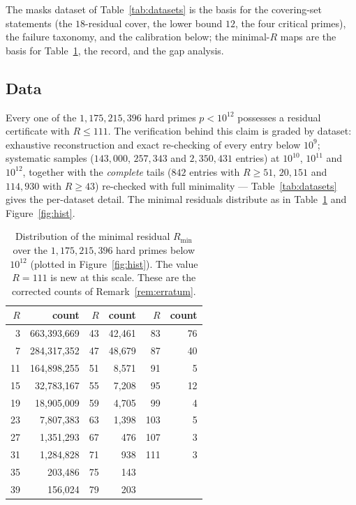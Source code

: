 \documentclass[11pt]{article}
\theoremstyle{plain}
\theoremstyle{remark}
\theoremstyle{plain}
\numberwithin{equation}{section}
\begin{document}
The masks dataset of Table~\ref{tab:datasets} is the basis for the
covering-set statements (the
$18$-residual cover, the lower bound $12$, the four critical primes), the
failure taxonomy, and the calibration below; the
minimal-$R$ maps are the basis for Table~\ref{tab:dist}, the record,
and the gap analysis.

\subsection{Data}

Every one of the $1{,}175{,}215{,}396$ hard primes $p < 10^{12}$ possesses a
residual certificate with $R \le 111$. The verification behind this
claim is graded by dataset: exhaustive reconstruction and exact
re-checking of every entry below $10^9$; systematic samples
($143{,}000$, $257{,}343$ and $2{,}350{,}431$ entries) at $10^{10}$,
$10^{11}$ and $10^{12}$,
together with the \emph{complete} tails ($842$ entries with
$R \ge 51$, $20{,}151$ and $114{,}930$ with $R \ge 43$) re-checked
with full
minimality --- Table~\ref{tab:datasets} gives the per-dataset detail.
The minimal residuals distribute
as in Table~\ref{tab:dist} and Figure~\ref{fig:hist}.

\begin{table}[htbp]
\centering
\begin{tabular}{rr@{\qquad}rr@{\qquad}rr}
\toprule
$R$ & count & $R$ & count & $R$ & count \\ \midrule
3 & 663{,}393{,}669 & 43 & 42{,}461 & 83 & 76 \\
7 & 284{,}317{,}352 & 47 & 48{,}679 & 87 & 40 \\
11 & 164{,}898{,}255 & 51 & 8{,}571 & 91 & 5 \\
15 & 32{,}783{,}167 & 55 & 7{,}208 & 95 & 12 \\
19 & 18{,}905{,}009 & 59 & 4{,}705 & 99 & 4 \\
23 & 7{,}807{,}383 & 63 & 1{,}398 & 103 & 5 \\
27 & 1{,}351{,}293 & 67 & 476 & 107 & 3 \\
31 & 1{,}284{,}828 & 71 & 938 & 111 & 3 \\
35 & 203{,}486 & 75 & 143 &  &  \\
39 & 156{,}024 & 79 & 203 &  &  \\
\bottomrule
\end{tabular}
\caption{Distribution of the minimal residual $R_{\min}$ over the
$1{,}175{,}215{,}396$ hard primes below $10^{12}$ (plotted in
Figure~\ref{fig:hist}). The value $R = 111$ is new at this scale.
These are the corrected counts of Remark~\ref{rem:erratum}.}
\label{tab:dist}
\end{table}
\end{document}
